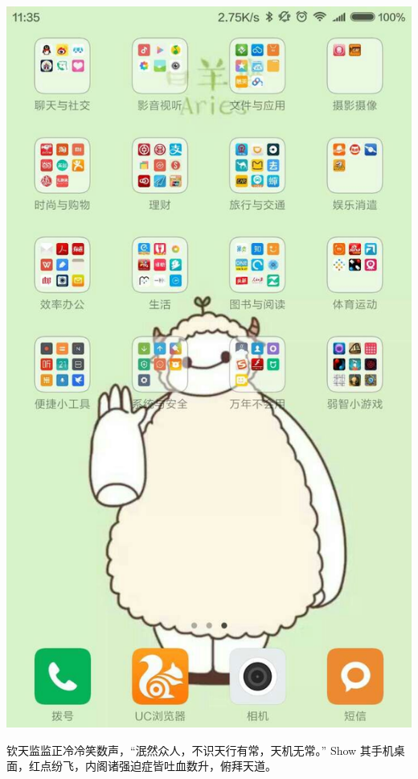 \documentclass[12pt, a4paper]{book}
\begin{document}
\begin{CJK}{UTF8}{gbsn}
    \begin{center}
    \includegraphics[height=0.3\textheight]{./figure/desktop-4.jpg}
    \end{center}

    钦天监监正冷冷笑数声，“泯然众人，不识天行有常，天机无常。” Show 其手机桌面，红点纷飞，内阁诸强迫症皆吐血数升，俯拜天道。


\end{CJK}
\end{document}
